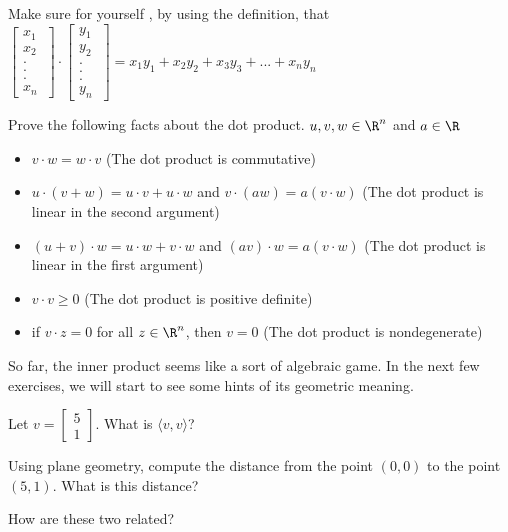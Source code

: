 \begin{question}
	Make sure for yourself , by using the definition, that 
	$\begin{bmatrix} x_1 \\x_2\\ .\\.\\. \\ x_n\ \end{bmatrix} \cdot \begin{bmatrix} y_1 \\y_2\\ .\\.\\. \\ y_n\ \end{bmatrix}  = x_1y_1+x_2y_2+x_3y_3 + ...+x_ny_n$
\end{question}

\begin{question}
	Prove the following facts about the dot product.  $u,v,w \in \R^n$ and $a \in \R$
		\begin{itemize}
			\item $v \cdot w = w \cdot v$ (The dot product is commutative)
			
			\item $u \cdot (v+w) = u\cdot v+ u\cdot w$ and  $v \cdot (aw) = a(v \cdot  w)$ (The dot product is linear in the second argument)
			
			\item $(u+v)\cdot w = u\cdot w + v\cdot w$ 	and $(av)\cdot w = a(v \cdot w)$ 	(The dot product is linear in the first argument)
			
			\item $v\cdot v \geq 0$		(The dot product is positive definite)
			
			\item if $v \cdot z = 0$ for all $z \in \R^n$, then $v =0$ (The dot product is nondegenerate)
		\end{itemize}
\end{question}


So far, the inner product seems like a sort of algebraic game.  In the next few exercises, we will start to see some hints of its geometric meaning.

\begin{question}
	Let $v  = \begin{bmatrix}  5  \\ 1\end{bmatrix}$.  What is $\langle v,v\rangle$?  
	
	Using plane geometry, compute the distance from the point $(0,0)$ to the point $(5,1)$.  What is this distance?
	
	How are these two related?
\end{question}

